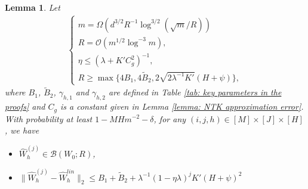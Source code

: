 \documentclass{article} \usepackage{iclr2023/iclr2023_conference,times}
\newtheorem{lemma}{Lemma}[section]
\begin{document}
\begin{lemma}
Let 
\begin{align}
\begin{cases}
m = \Omega \left( d^{3/2}  R^{-1} \log^{3/2} (\sqrt{m} / R) \right) \\
      R = \mathcal{O} \left( m^{1/2} \log^{-3} m \right), \\ 
\eta \leq (\lambda + K' C_g^2)^{-1}, \\
R \geq \max\{ 4 B_1, 4 \tilde{B}_2, 2 \sqrt{2\lambda^{-1}K'} (H + \psi) \},
\end{cases}
\label{equation: improved conditions for R and eta comprehensive list for non-perturbed loss}
\end{align}
where  $B_1$, $\tilde{B}_2$, $\gamma_{h,1}$ and $\gamma_{h,2}$ are defined in Table \ref{tab: key parameters in the proofs} and $C_g$ is a constant given in Lemma \ref{lemma: NTK approximation error}. 
With probability at least $1 -  MH m^{-2} - \delta$, for any $(i,j,h) \in [M] \times [J] \times [H]$, we have 
\begin{itemize}
    \item $\hat{W}_h^{ (j)} \in \mathcal{B}(W_0; R)$, 
    \item $\| \hat{W}_h^{(j)} - \hat{W}_h^{lin} \|_2 \leq B_1 + \tilde{B}_2 + \lambda^{-1}(1 - \eta \lambda)^j  K'(H + \psi  )^2 $
\end{itemize}
\label{lemma: improved bounding GD weight and that of linear auxilary for non-perturbed loss}
\end{lemma}
\end{document}
